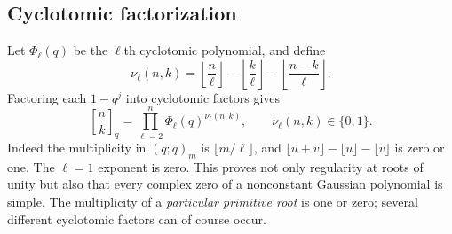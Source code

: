 \documentclass[11pt,a4paper]{article}
\numberwithin{equation}{section}
\theoremstyle{definition}
\theoremstyle{remark}
\newcommand{\G}[2]{\genfrac{[}{]}{0pt}{}{#1}{#2}_{q}}
\begin{document}
\subsection{Cyclotomic factorization}
Let $\Phi_\ell(q)$ be the $\ell$th cyclotomic polynomial, and define
\begin{equation}
 \nu_\ell(n,k)=\left\lfloor\frac n\ell\right\rfloor
 -\left\lfloor\frac k\ell\right\rfloor
 -\left\lfloor\frac{n-k}\ell\right\rfloor.
 \label{eq:cyclotomic-exponent}
\end{equation}
Factoring each $1-q^j$ into cyclotomic factors gives
\begin{equation}
 \G nk=\prod_{\ell=2}^{n}\Phi_\ell(q)^{\nu_\ell(n,k)},
 \qquad \nu_\ell(n,k)\in\{0,1\}.
 \label{eq:gaussian-cyclotomic}
\end{equation}
Indeed the multiplicity in $(q;q)_m$ is $\lfloor m/\ell\rfloor$,
and $\lfloor u+v\rfloor-\lfloor u\rfloor-\lfloor v\rfloor$ is zero
or one. The $\ell=1$ exponent is zero. This proves not only regularity
at roots of unity but also that every complex zero of a nonconstant
Gaussian polynomial is simple. The multiplicity of a \emph{particular
primitive root} is one or zero; several different cyclotomic factors
can of course occur.
\end{document}
